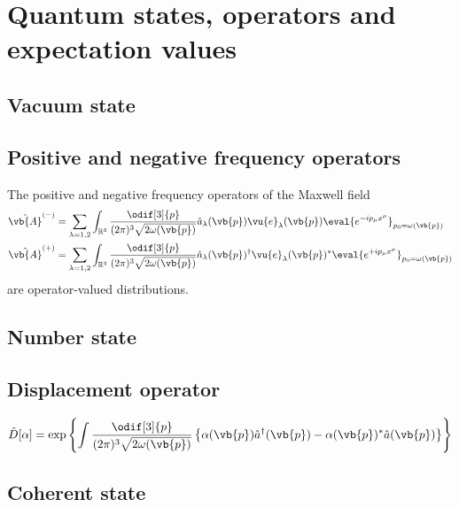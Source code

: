 \section{Quantum states, operators and expectation values}

\subsection{Vacuum state}

\subsection{Positive and negative frequency operators}


The positive and negative frequency operators of the Maxwell field
\begin{align}
	\hat{\vb{A}}^{(-)}
	&=
	\sum_{\lambda=1,2}
	\int_{\mathbb{R}^3}
	\frac{\odif[3]{p}}{(2\pi)^3\sqrt{2\omega(\vb{p})}}
	\hat{a}_\lambda(\vb{p})
	\vu{e}_\lambda(\vb{p})
	\eval{e^{-ip_\mu x^\mu}}_{p_0=\omega(\vb{p})}
	\\
	\hat{\vb{A}}^{(+)}
	&=
	\sum_{\lambda=1,2}
	\int_{\mathbb{R}^3}
	\frac{\odif[3]{p}}{(2\pi)^3\sqrt{2\omega(\vb{p})}}
	\hat{a}_\lambda(\vb{p})^\dagger
	\vu{e}_\lambda(\vb{p})^*
	\eval{e^{+ip_\mu x^\mu}}_{p_0=\omega(\vb{p})}
\end{align}
are operator-valued distributions.

\subsection{Number state}

\subsection{Displacement operator}

\begin{equation}
	\hat{D}[\alpha]
	=
	\exp\left\{
		\int\frac{\odif[3]{p}}{(2\pi)^3\sqrt{2\omega(\vb{p})}}
		\left\{
			\alpha(\vb{p})
			\hat{a}^\dagger(\vb{p})
			-
			\alpha(\vb{p})^*
			\hat{a}(\vb{p})
		\right\}
	\right\}
\end{equation}

\subsection{Coherent state}

